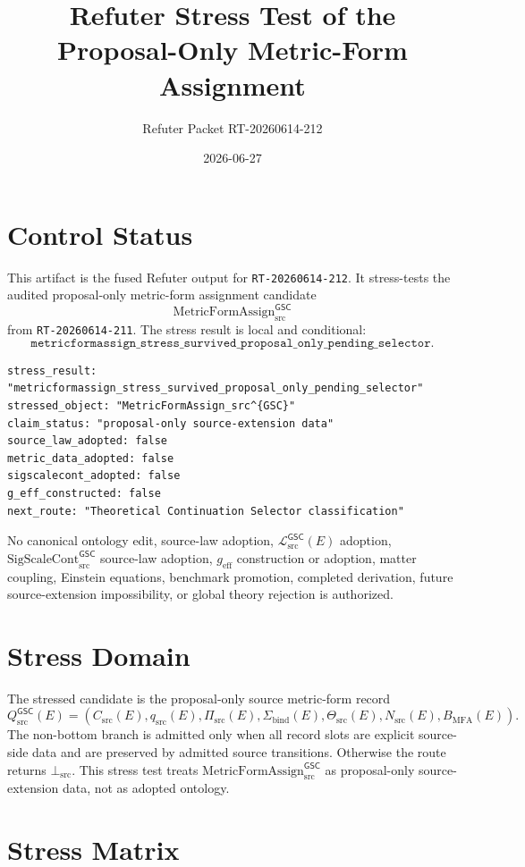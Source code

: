 \documentclass[11pt]{article}
\title{Refuter Stress Test of the Proposal-Only Metric-Form Assignment}
\author{Refuter Packet RT-20260614-212}
\date{2026-06-27}
\newcommand{\MetricData}{\mathcal{L}_{\mathrm{src}}^{\mathsf{GSC}}}
\newcommand{\geff}{g_{\mathrm{eff}}}
\newcommand{\SigScaleCont}{\mathrm{SigScaleCont}_{\mathrm{src}}^{\mathsf{GSC}}}
\newcommand{\MetricFormAssign}{\mathrm{MetricFormAssign}_{\mathrm{src}}^{\mathsf{GSC}}}
\newcommand{\Qsrc}{Q_{\mathrm{src}}^{\mathsf{GSC}}}
\newcommand{\CarrierSrc}{C_{\mathrm{src}}}
\newcommand{\FormTok}{q_{\mathrm{src}}}
\newcommand{\PairTok}{\Pi_{\mathrm{src}}}
\newcommand{\TransportTok}{\Theta_{\mathrm{src}}}
\newcommand{\NondegTok}{N_{\mathrm{src}}}
\newcommand{\BottomSrc}{\bot_{\mathrm{src}}}
\begin{document}
\maketitle

\section{Control Status}

This artifact is the fused Refuter output for \texttt{RT-20260614-212}. It
stress-tests the audited proposal-only metric-form assignment candidate
\[
  \MetricFormAssign
\]
from \texttt{RT-20260614-211}. The stress result is local and conditional:
\[
  \texttt{metricformassign\_stress\_survived\_proposal\_only\_pending\_selector}.
\]

\begin{verbatim}
stress_result: "metricformassign_stress_survived_proposal_only_pending_selector"
stressed_object: "MetricFormAssign_src^{GSC}"
claim_status: "proposal-only source-extension data"
source_law_adopted: false
metric_data_adopted: false
sigscalecont_adopted: false
g_eff_constructed: false
next_route: "Theoretical Continuation Selector classification"
\end{verbatim}

No canonical ontology edit, source-law adoption, \(\MetricData(E)\) adoption,
\(\SigScaleCont\) source-law adoption, \(\geff\) construction or adoption,
matter coupling, Einstein equations, benchmark promotion, completed
derivation, future source-extension impossibility, or global theory rejection
is authorized.

\section{Stress Domain}

The stressed candidate is the proposal-only source metric-form record
\[
  \Qsrc(E)=
  (\CarrierSrc(E),\FormTok(E),\PairTok(E),\Sigma_{\mathrm{bind}}(E),
  \TransportTok(E),\NondegTok(E),B_{\mathrm{MFA}}(E)).
\]
The non-bottom branch is admitted only when all record slots are explicit
source-side data and are preserved by admitted source transitions. Otherwise
the route returns \(\BottomSrc\). This stress test treats
\(\MetricFormAssign\) as proposal-only source-extension data, not as adopted
ontology.

\section{Stress Matrix}
\end{document}
